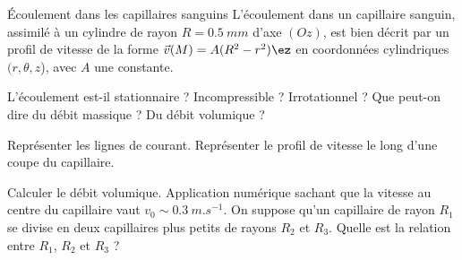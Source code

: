 \begin{exo}[PC][2][TD]{Écoulement dans les capillaires sanguins}
L'écoulement dans un capillaire sanguin, assimilé à un cylindre de rayon $R=\SI{0.5}{mm}$ d’axe $(Oz)$, est bien décrit par un profil de vitesse de la forme $\vec{v}(M)=A(R^2-r^2)\ez$ en coordonnées cylindriques $(r,\theta,z$), avec $A$ une constante.
\begin{quest}
\item L'écoulement est-il stationnaire ? Incompressible ? Irrotationnel ?  Que peut-on dire du débit massique ? Du débit volumique ?
\item Représenter les lignes de courant. Représenter le profil de vitesse le long d'une coupe du capillaire.
\item Calculer le débit volumique. Application numérique sachant que la vitesse au centre du capillaire vaut $v_0 \sim \SI{0.3}{m.s^{-1}}$.
On suppose qu’un capillaire de rayon $R_1$ se divise en deux capillaires plus petits de rayons $R_2$ et $R_3$. Quelle est la relation entre $R_1$, $R_2$ et $R_3$ ?

\end{quest}

\end{exo}


